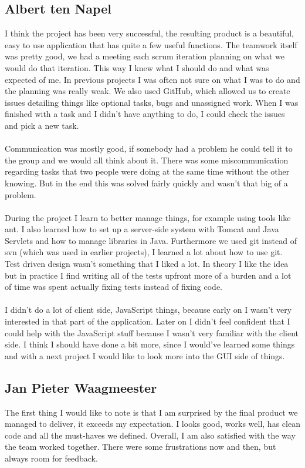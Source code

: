 \documentclass[a4paper]{article}
\begin{document}
\subsection{Albert ten Napel}
I think the project has been very successful, the resulting product is a beautiful, easy to use application that has quite a few useful functions. The teamwork itself was pretty good, we had a meeting each scrum iteration planning on what we would do that iteration. This way I knew what I should do and what was expected of me. In previous projects I was often not sure on what I was to do and the planning was really weak. We also used GitHub, which allowed us to create issues detailing things like optional tasks, bugs and unassigned work. When I was finished with a task and I didn't have anything to do, I could check the issues and pick a new task.\\
\\
Communication was mostly good, if somebody had a problem he could tell it to the group and we would all think about it. There was some miscommunication regarding tasks that two people were doing at the same time without the other knowing. But in the end this was solved fairly quickly and wasn't that big of a problem.\\
\\
During the project I learn to better manage things, for example using tools like ant. I also learned how to set up a server-side system with Tomcat and Java Servlets and how to manage libraries in Java. Furthermore we used git instead of svn (which was used in earlier projects), I learned a lot about how to use git.\\
Test driven design wasn't something that I liked a lot. In theory I like the idea but in practice I find writing all of the tests upfront more of a burden and a lot of time was spent actually fixing tests instead of fixing code.\\
\\
I didn't do a lot of client side, JavaScript things, because early on I wasn't very interested in that part of the application. Later on I didn't feel confident that I could help with the JavaScript stuff because I wasn't very familiar with the client side. I think I should have done a bit more, since I would've learned some things and with a next project I would like to look more into the GUI side of things.

\subsection{Jan Pieter Waagmeester}
The first thing I would like to note is that I am surprised by the final product we managed to deliver, it exceeds my expectation. I looks good, works well, has clean code and all the must-haves we defined. Overall, I am also satisfied with the way the team worked together. There were some frustrations now and then, but always room for feedback. 
\end{document}
